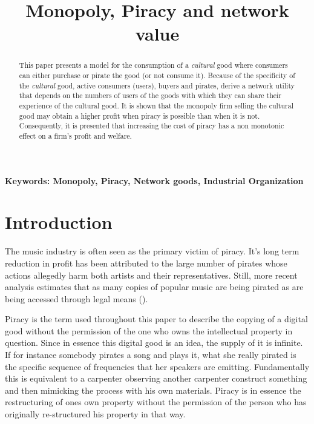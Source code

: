 \documentclass[12pt]{article}
\numberwithin{equation}{section}
\begin{document}
\title{Monopoly, Piracy and network value}

\maketitle

\begin{abstract}
This paper presents a model for the consumption of a \textit{cultural} good where consumers can either purchase or pirate the good (or not consume it). Because of the specificity of the \textit{cultural} good, active consumers (users), buyers and pirates, derive a network utility that depends on the numbers of users of the goods with which they can share their experience of the cultural good. It is shown that the monopoly firm selling the cultural good may obtain a higher profit when piracy is possible than when it is not. Consequently, it is presented that increasing the cost of piracy has a non monotonic effect on a firm's profit and welfare.
\end{abstract}

\noindent\textbf{Keywords: Monopoly, Piracy, Network goods, Industrial Organization}

\section{Introduction}

The music industry is often seen as the primary victim of piracy. It's long term reduction in profit has been attributed to the large number of pirates whose actions allegedly harm both artists and their representatives\citep{B03}. Still, more recent analysis estimates that as many copies of popular music are being pirated as are being accessed through legal means (\citep{O15}).

\iffalse
Piracy is the term used throughout this paper to describe the copying of a digital good without the permission of the one who owns the intellectual property in question. Since in essence this digital good is an idea, the supply of it is infinite. If for instance somebody pirates a song and plays it, what she really pirated is the specific sequence of frequencies that her speakers are emitting. Fundamentally this is equivalent to a carpenter observing another carpenter construct something and then mimicking the process with his own materials. Piracy is in essence the restructuring of ones  own property without the permission of the person who has originally re-structured his property in that way.
\end{document}
